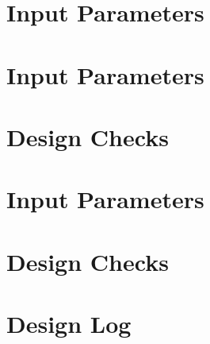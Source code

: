 \documentclass{article}%
\begin{document}
%
\normalsize%
\section{Input Parameters}
\section{Input Parameters}
\section{Design Checks}
\section{Input Parameters}
\section{Design Checks}
\section{Design Log}%
\end{document}
